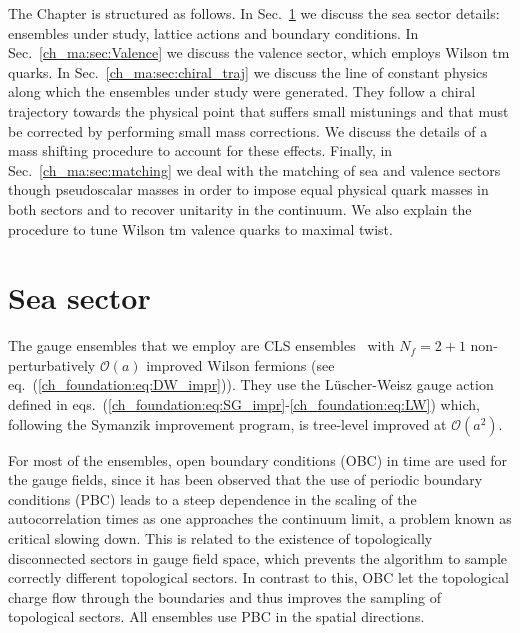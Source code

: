 The Chapter is structured as follows. In Sec.~\ref{ch_ma:sec:Sea} we discuss the sea sector details: ensembles under study, lattice actions and boundary conditions. In Sec.~\ref{ch_ma:sec:Valence} we discuss the valence sector, which employs Wilson tm quarks. In Sec.~\ref{ch_ma:sec:chiral_traj} we discuss the line of constant physics along which the ensembles under study were generated. They follow a chiral trajectory towards the physical point that suffers small mistunings and that must be corrected by performing small mass corrections. We discuss the details of a mass shifting procedure to account for these effects. Finally, in Sec.~\ref{ch_ma:sec:matching} we deal with the matching of sea and valence sectors though pseudoscalar masses in order to impose equal physical quark masses in both sectors and to recover unitarity in the continuum. We also explain the procedure to tune Wilson tm valence quarks to maximal twist.


\section{Sea sector}
\label{ch_ma:sec:Sea}

The gauge ensembles that we employ are CLS ensembles~\citep{Bruno:2014jqa,Mohler:2017wnb} with $N_f=2+1$ non-perturbatively $\mathcal{O}(a)$ improved Wilson fermions (see eq.~(\ref{ch_foundation:eq:DW_impr})). They use the Lüscher-Weisz gauge action~\citep{Luscher:1985zq} defined in eqs.~(\ref{ch_foundation:eq:SG_impr}-\ref{ch_foundation:eq:LW}) which, following the Symanzik improvement program, is  tree-level improved at $\mathcal{O}(a^2)$.

For most of the ensembles, open boundary conditions (OBC) in time are used for the gauge fields, since it has been observed that the use of periodic boundary conditions (PBC) leads to a steep dependence in the scaling of  the autocorrelation times as one approaches the continuum limit, a problem known as critical slowing down. This is related to the existence of topologically disconnected sectors in gauge field space, which prevents the algorithm to sample correctly different topological sectors. In contrast to this, OBC let the topological charge flow through the boundaries and thus improves the sampling of topological sectors. All ensembles use PBC in the spatial directions.

